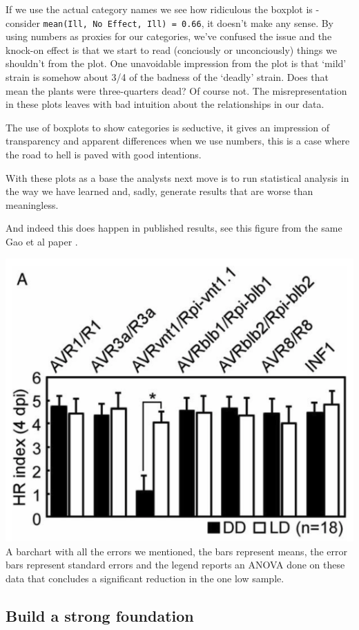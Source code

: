 \documentclass[
]{book}
\begin{document}
If we use the actual category names we see how ridiculous the boxplot is - consider \texttt{mean(Ill,\ No\ Effect,\ Ill)\ =\ 0.66}, it doesn't make any sense. By using numbers as proxies for our categories, we've confused the issue and the knock-on effect is that we start to read (conciously or unconciously) things we shouldn't from the plot. One unavoidable impression from the plot is that `mild' strain is somehow about 3/4 of the badness of the `deadly' strain. Does that mean the plants were three-quarters dead? Of course not. The misrepresentation in these plots leaves with bad intuition about the relationships in our data.

The use of boxplots to show categories is seductive, it gives an impression of transparency and apparent differences when we use numbers, this is a case where the road to hell is paved with good intentions.

With these plots as a base the analysts next move is to run statistical analysis in the way we have learned and, sadly, generate results that are worse than meaningless.

And indeed this does happen in published results, see this figure from the same Gao et al \citet{Gao9613} paper .

\includegraphics{fig/dong_fig1A.png}
A barchart with all the errors we mentioned, the bars represent means, the error bars represent standard errors and the legend reports an ANOVA done on these data that concludes a significant reduction in the one low sample.

\hypertarget{build-a-strong-foundation}{%
\subsection{Build a strong foundation}\label{build-a-strong-foundation}}
\end{document}
